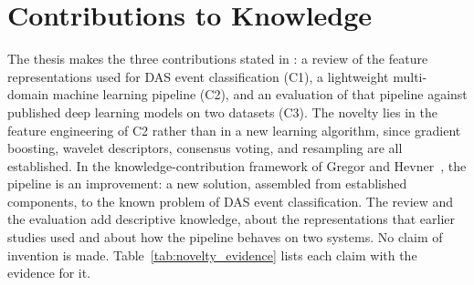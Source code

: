 \section{Contributions to Knowledge}
\label{sec:chap5Contributions}
The thesis makes the three contributions stated in : a review of the feature representations used for DAS event classification (C1), a lightweight multi-domain machine learning pipeline (C2), and an evaluation of that pipeline against published deep learning models on two datasets (C3). The novelty lies in the feature engineering of C2 rather than in a new learning algorithm, since gradient boosting, wavelet descriptors, consensus voting, and resampling are all established. In the knowledge-contribution framework of Gregor and Hevner~\cite{gregor2013positioning}, the pipeline is an improvement: a new solution, assembled from established components, to the known problem of DAS event classification. The review and the evaluation add descriptive knowledge, about the representations that earlier studies used and about how the pipeline behaves on two systems. No claim of invention is made. Table~\ref{tab:novelty_evidence} lists each claim with the evidence for it.

